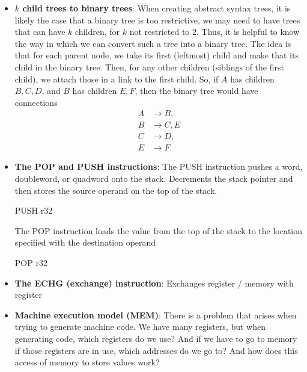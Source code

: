 \documentclass{report}
\begin{document}
\begin{itemize}
            \bigbreak \noindent 
            \begin{cppcode}
            e = 1
            // b!=0 and b>=0 (nonnegative b) implies b>0
            while (b>0) {
                if (b & 0x01) {
                    e = e * a
                }
                a = a*a
                b>>=1 // Divide by two
            }
            \end{cppcode}
        \item \textbf{$k$ child trees to binary trees}: When creating abstract syntax trees, it is likely the case that a binary tree is too restrictive, we may need to have trees that can have $k$ children, for $k$ not restricted to $2$. Thus, it is helpful to know the way in which we can convert such a tree into a binary tree.
            \bigbreak \noindent 
            The idea is that for each parent node, we take its first (leftmost) child and make that its child in the binary tree. Then, for any other children (siblings of the first child), we attach those in a link to the first child. So, if $A$ has children $B,C,D$, and $B$ has children $E,F$, then the binary tree would have connections
            \begin{align*}
                A &\to B, \\
                B &\to C,E \\
                C &\to D, \\
                E &\to F
            .\end{align*}
        \item \textbf{The POP and PUSH instructions}: The PUSH instruction pushes a word, doubleword, or quadword onto the stack. Decrements the stack pointer and then stores the source operand on the top of the stack.
            \bigbreak \noindent 
            \begin{cppcode}
            PUSH    r32
            \end{cppcode}
            \bigbreak \noindent 
            The POP instruction loads the value from the top of the stack to the location specified with the destination operand
            \bigbreak \noindent 
            \begin{cppcode}
            POP     r32
            \end{cppcode}
        \item \textbf{The ECHG (exchange) instruction}: Exchanges register / memory with register
        \item \textbf{Machine execution model (MEM)}: There is a problem that arises when trying to generate machine code. We have many registers, but when generating code, which registers do we use? And if we have to go to memory if those registers are in use, which addresses do we go to? And how does this access of memory to store values work? 

\end{itemize}
\end{document}
